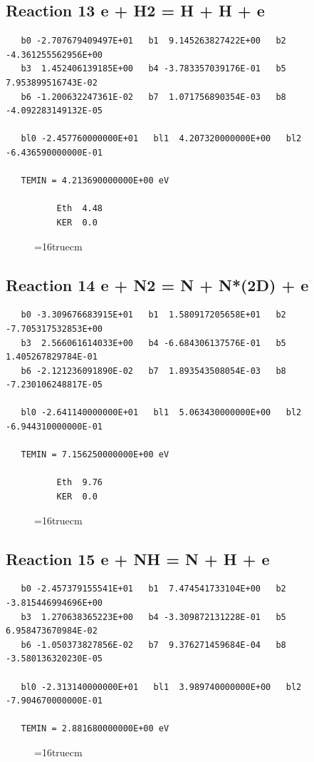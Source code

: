 \documentclass[12pt,dvipdfm]{article}
\begin{document}
\subsection{
Reaction 13 e + H2 = H + H + e }
\begin{small}\begin{verbatim}
   b0 -2.707679409497E+01   b1  9.145263827422E+00   b2 -4.361255562956E+00
   b3  1.452406139185E+00   b4 -3.783357039176E-01   b5  7.953899516743E-02
   b6 -1.200632247361E-02   b7  1.071756890354E-03   b8 -4.092283149132E-05

   bl0 -2.457760000000E+01   bl1  4.207320000000E+00   bl2 -6.436590000000E-01

   TEMIN = 4.213690000000E+00 eV

          Eth  4.48
          KER  0.0
\end{verbatim}\end{small}
\begin{figure}[h!] \label{n2rates}
\epsfxsize=16truecm
\end{figure}
\newpage

\subsection{
Reaction 14 e + N2 = N + N*(2D) + e }
\begin{small}\begin{verbatim}
   b0 -3.309676683915E+01   b1  1.580917205658E+01   b2 -7.705317532853E+00
   b3  2.566061614033E+00   b4 -6.684306137576E-01   b5  1.405267829784E-01
   b6 -2.121236091890E-02   b7  1.893543508054E-03   b8 -7.230106248817E-05

   bl0 -2.641140000000E+01   bl1  5.063430000000E+00   bl2 -6.944310000000E-01

   TEMIN = 7.156250000000E+00 eV

          Eth  9.76
          KER  0.0
\end{verbatim}\end{small}
\begin{figure}[h!] \label{n2rates}
\epsfxsize=16truecm
\end{figure}
\newpage

\subsection{
Reaction 15 e + NH = N + H + e }
\begin{small}\begin{verbatim}
   b0 -2.457379155541E+01   b1  7.474541733104E+00   b2 -3.815446994696E+00
   b3  1.270638365223E+00   b4 -3.309872131228E-01   b5  6.958473670984E-02
   b6 -1.050373827856E-02   b7  9.376271459684E-04   b8 -3.580136320230E-05

   bl0 -2.313140000000E+01   bl1  3.989740000000E+00   bl2 -7.904670000000E-01

   TEMIN = 2.881680000000E+00 eV
\end{verbatim}\end{small}
\begin{figure}[h!] \label{n2rates}
\epsfxsize=16truecm
\end{figure}
\newpage
\end{document}
